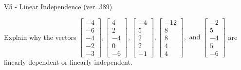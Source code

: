 \begin{exercise}
  \begin{exerciseTitle}V5 - Linear Independence (ver. 389)\end{exerciseTitle}
  \begin{exerciseStatement}
    Explain why the vectors \(\left[\begin{array}{r}
-4 \\
-6 \\
-4 \\
-2 \\
-3
\end{array}\right] , \left[\begin{array}{r}
4 \\
2 \\
-4 \\
0 \\
-6
\end{array}\right] , \left[\begin{array}{r}
-4 \\
5 \\
2 \\
2 \\
-1
\end{array}\right] , \left[\begin{array}{r}
-12 \\
8 \\
8 \\
4 \\
4
\end{array}\right] , \text{ and } \left[\begin{array}{r}
-2 \\
5 \\
-4 \\
5 \\
-6
\end{array}\right]\) are linearly dependent or linearly independent.	



\end{exerciseStatement}
\end{exercise}
